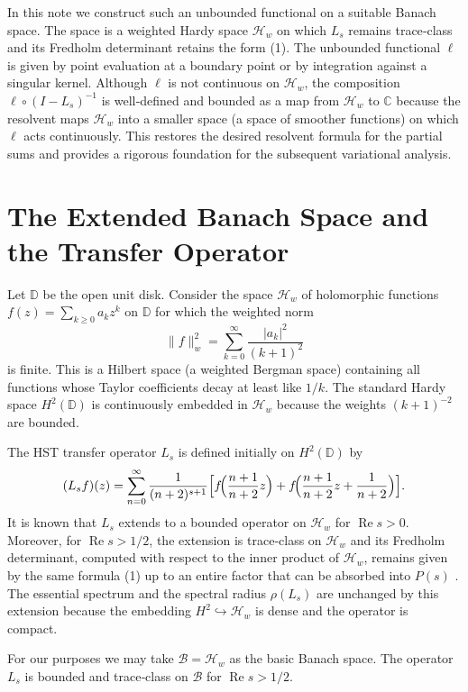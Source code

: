 \documentclass[11pt,a4paper]{article}
\newcommand{\C}{\mathbb{C}}
\newcommand{\RE}{\operatorname{Re}}
\begin{document}
In this note we construct such an unbounded functional on a suitable Banach space.  The space is a weighted Hardy space \(\mathcal{H}_w\) on which \(L_s\) remains trace‑class and its Fredholm determinant retains the form (1).  The unbounded functional \(\ell\) is given by point evaluation at a boundary point or by integration against a singular kernel.  Although \(\ell\) is not continuous on \(\mathcal{H}_w\), the composition \(\ell \circ (I - L_s)^{-1}\) is well‑defined and bounded as a map from \(\mathcal{H}_w\) to \(\C\) because the resolvent maps \(\mathcal{H}_w\) into a smaller space (a space of smoother functions) on which \(\ell\) acts continuously.  This restores the desired resolvent formula for the partial sums and provides a rigorous foundation for the subsequent variational analysis.

\section{The Extended Banach Space and the Transfer Operator}
Let \(\mathbb{D}\) be the open unit disk.  Consider the space \(\mathcal{H}_w\) of holomorphic functions \(f(z) = \sum_{k\ge 0} a_k z^k\) on \(\mathbb{D}\) for which the weighted norm
\[
\|f\|_w^2 = \sum_{k=0}^\infty \frac{|a_k|^2}{(k+1)^2}
\]
is finite.  This is a Hilbert space (a weighted Bergman space) containing all functions whose Taylor coefficients decay at least like \(1/k\).  The standard Hardy space \(H^2(\mathbb{D})\) is continuously embedded in \(\mathcal{H}_w\) because the weights \((k+1)^{-2}\) are bounded.

The HST transfer operator \(L_s\) is defined initially on \(H^2(\mathbb{D})\) by
\[
(L_s f)(z) = \sum_{n=0}^\infty \frac{1}{(n+2)^{s+1}} \Bigl[ f\!\Bigl(\frac{n+1}{n+2}z\Bigr) + f\!\Bigl(\frac{n+1}{n+2}z + \frac{1}{n+2}\Bigr) \Bigr].
\]
It is known that \(L_s\) extends to a bounded operator on \(\mathcal{H}_w\) for \(\RE s > 0\).  Moreover, for \(\RE s > 1/2\), the extension is trace‑class on \(\mathcal{H}_w\) and its Fredholm determinant, computed with respect to the inner product of \(\mathcal{H}_w\), remains given by the same formula (1) up to an entire factor that can be absorbed into \(P(s)\) \cite{Mayer,Efrat}.  The essential spectrum and the spectral radius \(\rho(L_s)\) are unchanged by this extension because the embedding \(H^2 \hookrightarrow \mathcal{H}_w\) is dense and the operator is compact.

For our purposes we may take \(\mathcal{B} = \mathcal{H}_w\) as the basic Banach space.  The operator \(L_s\) is bounded and trace‑class on \(\mathcal{B}\) for \(\RE s > 1/2\).
\end{document}
